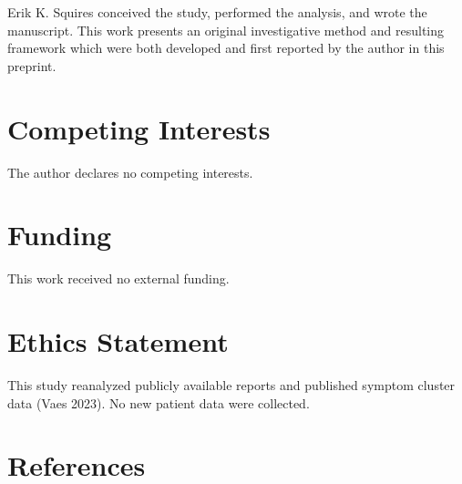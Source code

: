 \documentclass[
  letterpaper,
  DIV=11,
  numbers=noendperiod]{scrartcl}
\begin{document}
Erik K. Squires conceived the study, performed the analysis, and wrote
the manuscript. This work presents an original investigative method and
resulting framework which were both developed and first reported by the
author in this preprint.

\section*{Competing Interests}\label{competing-interests}

The author declares no competing interests.

\section*{Funding}\label{funding}

This work received no external funding.

\section*{Ethics Statement}\label{ethics-statement}

This study reanalyzed publicly available reports and published symptom
cluster data (Vaes 2023). No new patient data were collected.

\newpage{}

\section*{References}\label{references}
\end{document}
